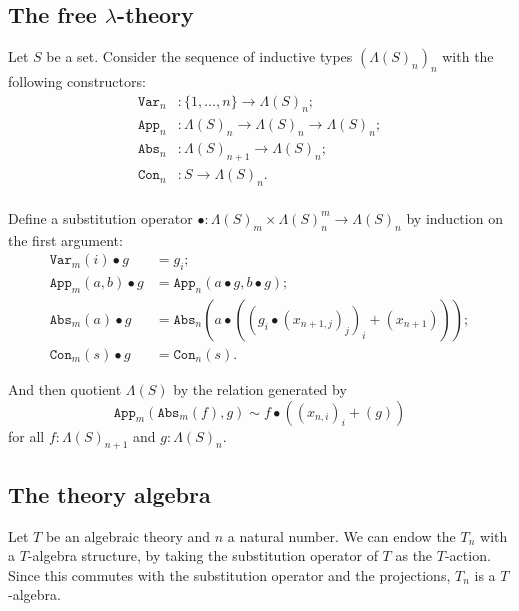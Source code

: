 \subsection{The free \texorpdfstring{$ \lambda $}{lambda}-theory}

Let $ S $ be a set. Consider the sequence of inductive types $ (\Lambda(S)_n)_n $ with the following constructors:
\begin{align*}
  \mathtt{Var}_n &: \{ 1, \dots, n \} \to \Lambda(S)_n;\\
  \mathtt{App}_n &: \Lambda(S)_n \to \Lambda(S)_n \to \Lambda(S)_n;\\
  \mathtt{Abs}_n &: \Lambda(S)_{n + 1} \to \Lambda(S)_n;\\
  \mathtt{Con}_n &: S \to \Lambda(S)_n.\\
\end{align*}

Define a substitution operator $ \bullet: \Lambda(S)_m \times \Lambda(S)_n^m \to \Lambda(S)_n $ by induction on the first argument:
\begin{align*}
  \mathtt{Var}_m(i) \bullet g &= g_i;\\
  \mathtt{App}_m(a, b) \bullet g &= \mathtt{App}_n(a \bullet g, b \bullet g);\\
  \mathtt{Abs}_m(a) \bullet g &= \mathtt{Abs}_n(a \bullet ((g_i \bullet (x_{n + 1, j})_j)_i + (x_{n + 1})));\\
  \mathtt{Con}_m(s) \bullet g &= \mathtt{Con}_n(s).
\end{align*}

And then quotient $ \Lambda(S) $ by the relation generated by
\[ \mathtt{App}_m(\mathtt{Abs}_m(f), g) \sim f \bullet ((x_{n, i})_i + (g)) \]
for all $ f: \Lambda(S)_{n + 1} $ and $ g: \Lambda(S)_n $.


\subsection{The theory algebra}
\begin{example}
  Let $ T $ be an algebraic theory and $ n $ a natural number. We can endow the $ T_n $ with a $ T $-algebra structure, by taking the substitution operator of $ T $ as the $ T $-action. Since this commutes with the substitution operator and the projections, $ T_n $ is a $ T $-algebra.
\end{example}

